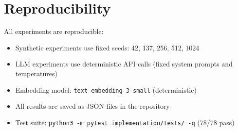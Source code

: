 \documentclass[10pt]{article}
\begin{document}
\section{Reproducibility}
\label{app:reproducibility}

All experiments are reproducible:
\begin{itemize}[leftmargin=*,itemsep=1pt]
\item Synthetic experiments use fixed seeds: 42, 137, 256, 512, 1024
\item LLM experiments use deterministic API calls (fixed system prompts and temperatures)
\item Embedding model: \texttt{text-embedding-3-small} (deterministic)
\item All results are saved as JSON files in the repository
\item Test suite: \texttt{python3 -m pytest implementation/tests/ -q} (78/78 pass)
\end{itemize}
\end{document}
